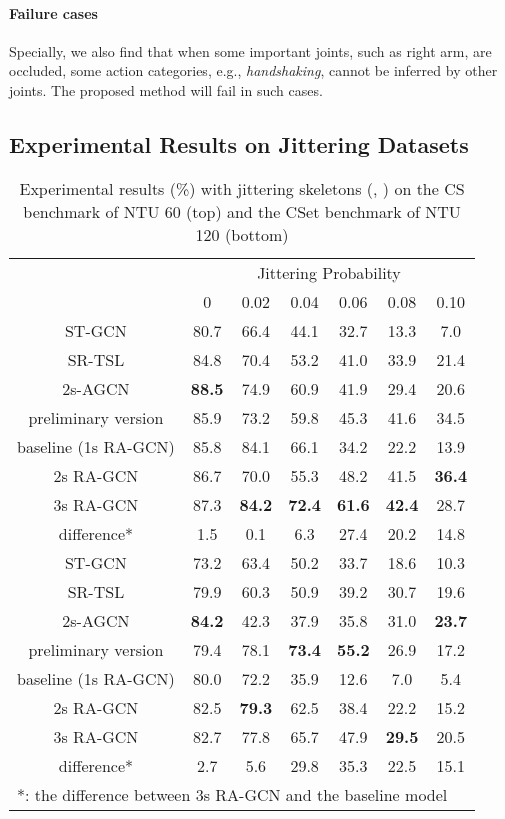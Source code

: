 \documentclass[journal]{IEEEtran}
\begin{document}
\paragraph{Failure cases} Specially, we also find that when some important joints, such as right arm, are occluded, some action categories, e.g., {\it handshaking}, cannot be inferred by other joints. The proposed method will fail in such cases.

\subsection{Experimental Results on Jittering Datasets}
\label{ssec:jittering}

\begin{table}[t]
\caption{Experimental results (\%) with jittering skeletons (, ) on the CS benchmark of NTU 60 (top) and the CSet benchmark of NTU 120 (bottom)}
\label{tab:jittering1}
\centering
\begin{tabular}{ccccccc}
\hline
 & \multicolumn{6}{c}{Jittering Probability} \\
\cline{2-7}
 & 0 & 0.02 & 0.04 & 0.06 & 0.08 & 0.10 \\
\hline
\hline
ST-GCN \cite{yan2018spatial} & 80.7 & 66.4 & 44.1 & 32.7 & 13.3 & 7.0 \\
SR-TSL \cite{si2018skeleton} & 84.8 & 70.4 & 53.2 & 41.0 & 33.9 & 21.4 \\
2s-AGCN \cite{shi2019two} & {\bf 88.5} & 74.9 & 60.9 & 41.9 & 29.4 & 20.6 \\
preliminary version \cite{song2019richly} & 85.9 & 73.2 & 59.8 & 45.3 & 41.6 & 34.5 \\
baseline (1s RA-GCN) & 85.8 & 84.1 & 66.1 & 34.2 & 22.2 & 13.9 \\
2s RA-GCN & 86.7 & 70.0 & 55.3 & 48.2 & 41.5 & {\bf 36.4} \\
3s RA-GCN & 87.3 & {\bf 84.2} & {\bf 72.4} & {\bf 61.6} & {\bf 42.4} & 28.7 \\
difference* & 1.5 & 0.1 & 6.3 & 27.4 & 20.2 & 14.8 \\
\hline
\hline
ST-GCN \cite{yan2018spatial} & 73.2 & 63.4 & 50.2 & 33.7 & 18.6 & 10.3 \\
SR-TSL \cite{si2018skeleton} & 79.9 & 60.3 & 50.9 & 39.2 & 30.7 & 19.6 \\
2s-AGCN \cite{shi2019two} & {\bf 84.2} & 42.3 & 37.9 & 35.8 & 31.0 & {\bf 23.7} \\
preliminary version \cite{song2019richly} & 79.4 & 78.1 & {\bf 73.4} & {\bf 55.2} & 26.9 & 17.2 \\
baseline (1s RA-GCN) & 80.0 & 72.2 & 35.9 & 12.6 & 7.0 & 5.4 \\
2s RA-GCN & 82.5 & {\bf 79.3} & 62.5 & 38.4 & 22.2 & 15.2 \\
3s RA-GCN & 82.7 & 77.8 & 65.7 & 47.9 & {\bf 29.5} & 20.5 \\
difference* & 2.7 & 5.6 & 29.8 & 35.3 & 22.5 & 15.1 \\
\hline
\multicolumn{7}{l}{*: the difference between 3s RA-GCN and the baseline model}
\end{tabular}
\vspace{-0.4cm}
\end{table}
\end{document}
